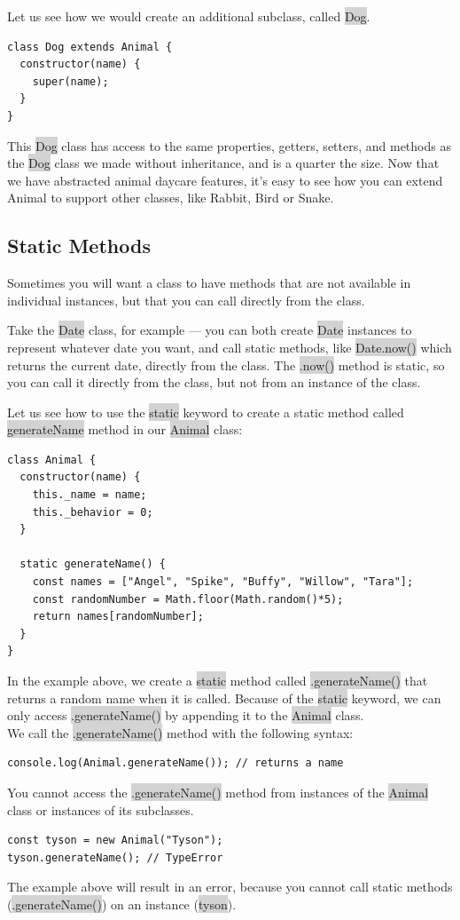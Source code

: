 \documentclass[11pt]{article}
\begin{document}
\newline
Let us see how we would create an additional subclass, called \colorbox{lightgray}{Dog}. 
\begin{lstlisting}
class Dog extends Animal {
  constructor(name) {
    super(name);
  }
}
\end{lstlisting}
This \colorbox{lightgray}{Dog} class has access to the same properties, getters, setters, and methods as the \colorbox{lightgray}{Dog} class we made without inheritance, and is a quarter the size. Now that we have abstracted animal daycare features, it’s easy to see how you can extend Animal to support other classes, like Rabbit, Bird or Snake.

\subsection{Static Methods} 
Sometimes you will want a class to have methods that are not available in individual instances, but that you can call directly from the class.

Take the \colorbox{lightgray}{Date} class, for example — you can both create \colorbox{lightgray}{Date} instances to represent whatever date you want, and call static methods, like \colorbox{lightgray}{Date.now()} which returns the current date, directly from the class. The \colorbox{lightgray}{.now()} method is static, so you can call it directly from the class, but not from an instance of the class.

Let us see how to use the \colorbox{lightgray}{static} keyword to create a static method called \colorbox{lightgray}{generateName} method in our \colorbox{lightgray}{Animal} class:
\begin{lstlisting}
class Animal {
  constructor(name) {
    this._name = name;
    this._behavior = 0;
  }

  static generateName() {
    const names = ["Angel", "Spike", "Buffy", "Willow", "Tara"];
    const randomNumber = Math.floor(Math.random()*5);
    return names[randomNumber];
  }
} 
\end{lstlisting}
In the example above, we create a \colorbox{lightgray}{static} method called \colorbox{lightgray}{.generateName()} that returns a random name when it is called. Because of the \colorbox{lightgray}{static} keyword, we can only access \colorbox{lightgray}{.generateName()} by appending it to the \colorbox{lightgray}{Animal} class. \\
\newline
We call the \colorbox{lightgray}{.generateName()} method with the following syntax:
\begin{lstlisting}
console.log(Animal.generateName()); // returns a name
\end{lstlisting}
You cannot access the \colorbox{lightgray}{.generateName()} method from instances of the \colorbox{lightgray}{Animal} class or instances of its subclasses.
\begin{lstlisting}
const tyson = new Animal("Tyson"); 
tyson.generateName(); // TypeError
\end{lstlisting}
The example above will result in an error, because you cannot call static methods (\colorbox{lightgray}{.generateName()}) on an instance (\colorbox{lightgray}{tyson}).
\end{document}
